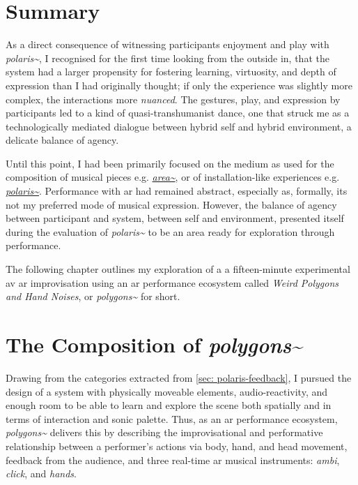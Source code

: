 \clearpage
\section{Summary}\label{sec: polygons-developing}
As a direct consequence of witnessing participants enjoyment and play with \textit{polaris\textasciitilde{}}, I recognised for the first time looking from the outside in, that the system had a larger propensity for fostering learning, virtuosity, and depth of expression than I had originally thought; if only the experience was slightly more complex, the interactions more \textit{nuanced}. The gestures, play, and expression by participants led to a kind of quasi-transhumanist dance, one that struck me as a technologically mediated dialogue between hybrid self and hybrid environment, a delicate balance of agency.



Until this point, I had been primarily focused on the medium as used for the composition of musical pieces e.g. \hyperref[sec: area]{\textit{area\textasciitilde{}}}, or of installation-like experiences e.g. \hyperref[sec: polaris]{\textit{polaris\textasciitilde{}}}. Performance with \gls{ar} had remained abstract, especially as, formally, its not my preferred mode of musical expression. However, the balance of agency between participant and system, between self and environment, presented itself during the evaluation of \textit{polaris\textasciitilde{}} to be an area ready for exploration through performance. 

The following chapter outlines my exploration of a a fifteen-minute experimental \gls{av} \gls{ar} improvisation using an \gls{ar} performance ecosystem called \textit{Weird Polygons and Hand Noises}, or \textit{polygons\textasciitilde{}} for short.



\section{The Composition of \textit{polygons\textasciitilde{}}}\label{sec: polygons-composition}

Drawing from the categories extracted from \autoref{sec: polaris-feedback}, I pursued the design of a system with physically moveable elements, audio-reactivity, and enough room to be able to learn and explore the scene both spatially and in terms of interaction and sonic palette. Thus, as an \gls{ar} performance ecosystem, \textit{polygons\textasciitilde{}} delivers this by describing the improvisational and performative relationship between a performer's actions via body, hand, and head movement, feedback from the audience, and three real-time \gls{ar} musical instruments: \textit{ambi}, \textit{click}, and \textit{hands}. 


